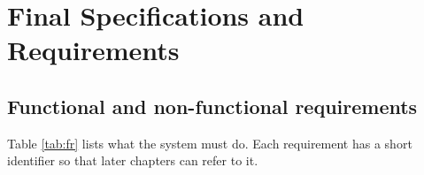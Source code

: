 
\section{Final Specifications and Requirements}

\subsection{Functional and non-functional requirements}

Table \ref{tab:fr} lists what the system must do. Each requirement has a short identifier
so that later chapters can refer to it.

